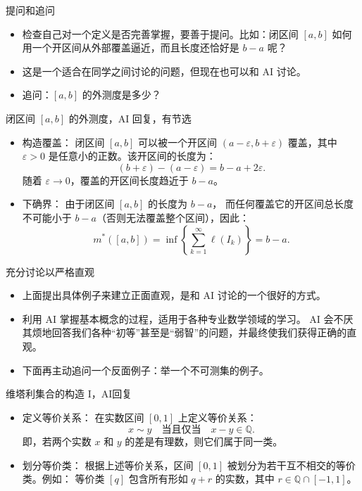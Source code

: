 \documentclass{beamer}
\begin{document}
\begin{frame}{提问和追问}
  \begin{itemize}
    \item<1-> 检查自己对一个定义是否完善掌握，要善于提问。比如：闭区间 $[a, b]$ 
    如何用一个开区间从外部覆盖逼近，而且长度还恰好是 $b - a$ 呢？
    \item<2-> 这是一个适合在同学之间讨论的问题，但现在也可以和 AI 讨论。
    \item<3-> 追问：$[a, b]$ 的外测度是多少？  
  \end{itemize}
\end{frame}

\begin{frame}{闭区间 $[a, b]$ 的外测度，AI 回复，有节选}
\begin{itemize}
  \item 构造覆盖： 闭区间 $[a, b]$ 可以被一个开区间 $(a - \varepsilon, b + \varepsilon)$ 
  覆盖，其中 $\varepsilon > 0$ 是任意小的正数。该开区间的长度为：
  $$
  (b + \varepsilon) - (a - \varepsilon) = b - a + 2\varepsilon.
  $$
  随着 $\varepsilon \to 0$，覆盖的开区间长度趋近于 $b - a$。
  \item 下确界： 由于闭区间 $[a, b]$ 的长度为 $b - a$，
  而任何覆盖它的开区间总长度不可能小于 $b - a$（否则无法覆盖整个区间），因此：
  $$
  m^*([a, b]) = \inf \left\{ \sum_{k=1}^\infty \ell(I_k) \right\} = b - a.
  $$
\end{itemize}
\end{frame}

\begin{frame}{充分讨论以严格直观}
  \begin{itemize}
    \item<1-> 上面提出具体例子来建立正面直观，是和 AI 讨论的一个很好的方式。 
    \item<2-> 利用 AI 掌握基本概念的过程，适用于各种专业数学领域的学习。
    AI 会不厌其烦地回答我们各种“初等”甚至是“弱智”的问题，并最终使我们获得正确的直观。 
    \item<3-> 下面再主动追问一个反面例子：举一个不可测集的例子。
  \end{itemize}
\end{frame}

\begin{frame}{维塔利集合的构造 I，AI回复}
  \begin{itemize}
    \item 定义等价关系： 在实数区间 $[0, 1]$ 上定义等价关系：
   $$
   x \sim y \quad \text{当且仅当} \quad x - y \in \mathbb{Q}.
   $$
   即，若两个实数 $x$ 和 $y$ 的差是有理数，则它们属于同一类。
    \item 划分等价类： 根据上述等价关系，区间 $[0, 1]$ 被划分为若干互不相交的等价类。例如：
   等价类 $[q]$ 包含所有形如 $q + r$ 的实数，其中 $r \in \mathbb{Q} \cap [-1, 1]$。
  \end{itemize}
\end{frame}
\end{document}
